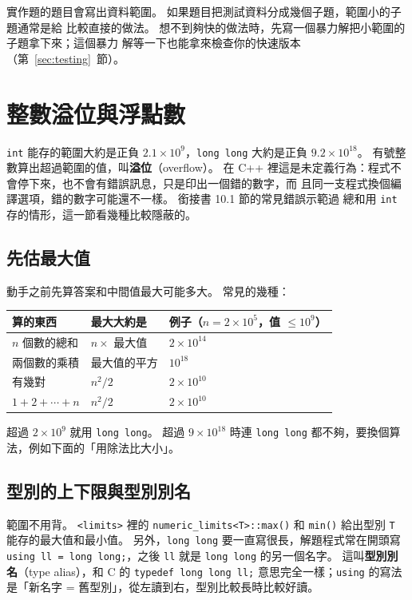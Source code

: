 \begin{apcsnote}
實作題的題目會寫出資料範圍。 如果題目把測試資料分成幾個子題，範圍小的子題通常是給
比較直接的做法。 想不到夠快的做法時，先寫一個暴力解把小範圍的子題拿下來；這個暴力
解等一下也能拿來檢查你的快速版本（第~\ref{sec:testing}~節）。
\end{apcsnote}

\section{整數溢位與浮點數}
\label{sec:overflow}

\texttt{int} 能存的範圍大約是正負 $2.1 \times 10^9$，\texttt{long long} 大約是正負
$9.2 \times 10^{18}$。 有號整數算出超過範圍的值，叫\textbf{溢位}（overflow）。 在
C++ 裡這是未定義行為：程式不會停下來，也不會有錯誤訊息，只是印出一個錯的數字，而
且同一支程式換個編譯選項，錯的數字可能還不一樣。 銜接書 10.1 節的常見錯誤示範過
總和用 \texttt{int} 存的情形，這一節看幾種比較隱蔽的。

\subsection{先估最大值}

動手之前先算答案和中間值最大可能多大。 常見的幾種：

\begin{center}
\begin{tabular}{lll}
\toprule
算的東西 & 最大大約是 & 例子（$n = 2 \times 10^5$，值 $\le 10^9$） \\
\midrule
$n$ 個數的總和 & $n \times$ 最大值 & $2 \times 10^{14}$ \\
兩個數的乘積 & 最大值的平方 & $10^{18}$ \\
有幾對 & $n^2/2$ & $2 \times 10^{10}$ \\
$1 + 2 + \cdots + n$ & $n^2/2$ & $2 \times 10^{10}$ \\
\bottomrule
\end{tabular}
\end{center}

超過 $2 \times 10^9$ 就用 \texttt{long long}。 超過 $9 \times 10^{18}$ 時連
\texttt{long long} 都不夠，要換個算法，例如下面的「用除法比大小」。

\subsection{型別的上下限與型別別名}

範圍不用背。 \texttt{<limits>} 裡的 \texttt{numeric\_limits<T>::max()} 和
\texttt{min()} 給出型別 \texttt{T} 能存的最大值和最小值。 另外，\texttt{long long}
要一直寫很長，解題程式常在開頭寫 \texttt{using ll = long long;}，之後 \texttt{ll}
就是 \texttt{long long} 的另一個名字。 這叫\textbf{型別別名}（type alias），和 C 的
\texttt{typedef long long ll;} 意思完全一樣；\texttt{using} 的寫法是「新名字 =
舊型別」，從左讀到右，型別比較長時比較好讀。

